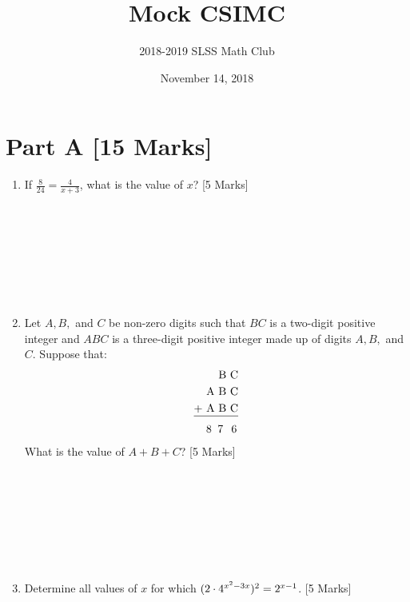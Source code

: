 \documentclass[12pt]{article}
\title{Mock CSIMC\vspace{-3mm}}
\author{2018-2019 SLSS Math Club\vspace{-5mm}}
\date{November 14, 2018\vspace{-5mm}}
\begin{document}
\maketitle

\newcommand{\aSpace}{\\ \\ \\ \\ \\ \\ \\ \\}
\section*{Part A [15 Marks]}
\begin{enumerate}
    \item If $\displaystyle{\frac{8}{24} = \frac{4}{x + 3}}$, what is the value of $x$? [5 Marks] \aSpace
    
    \item Let $A, B,$ and $C$ be non-zero digits such that $BC$ is a two-digit positive integer and $ABC$ is a three-digit positive integer made up of digits $A, B,$ and $C$. Suppose that:
    \begin{align*}
        \text{B }&\text{C}  \\
        \text{A B }&\text{C}  \\
        \text{+ A B }&\text{C} \\[-11pt]
        \cline{1-2}
        \text{8 \hspace{-0.5mm} 7 \hspace{1mm}}&\text{\hspace{-0.8mm} 6}
    \end{align*}
    What is the value of $A + B + C$? [5 Marks] \aSpace
    
    \item Determine all values of $x$ for which $\Large(2\cdot 4^{x^2 - 3x}\Large)^2 = 2^{x - 1}$. [5 Marks] \aSpace
\end{enumerate}
\end{document}
